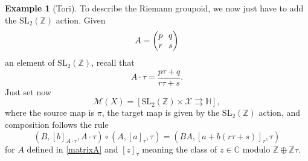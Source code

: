 \documentclass[JEP,XML,SOM,Unicode]{cedram}
\let\mathcal\mathscr
\newcommand{\SL}{\mathrm{SL}}
\theoremstyle{plain}
\theoremstyle{definition}
\newtheorem{example}[theorem]{Example}
\theoremstyle{remark}
\numberwithin{equation}{section}
\newcommand{\CC}{{\mathbb{C}}}
\begin{document}
\begin{example}[Tori]
To describe the Riemann groupoid, we now just have to add the $\SL_2(\mathbb Z)$ action. Given%
\begin{equation}
\label{matrixA}\arraycolsep3.5pt
A=\begin{pmatrix}
p &q\cr
r &s
\end{pmatrix}
\end{equation}
an element of $\SL_2(\mathbb Z)$, recall that
\begin{equation}
\label{sl2action}
A\cdot \tau=\dfrac{p\tau+q}{r\tau+s}.
\end{equation}
Just set now
\begin{equation}
\label{toriMgroupoid}
\mathcal M(X)=\left[\SL_2(\mathbb Z)\times\mathcal X\rightrightarrows \mathbb H\right ],
\end{equation}
where the source map is $\pi$, the target map is given by the $\SL_2(\mathbb Z)$ action, and composition follows the rule
\begin{equation}
\label{comptori}
(B,[b]_{A\cdot \tau},A\cdot \tau)\circ (A,[a]_\tau,\tau) =(BA,[a+b(r\tau+s)]_\tau, \tau)
\end{equation}
for $A$ defined in \eqref{matrixA} and $[z]_\tau$ meaning the class of $z\in\CC$ modulo $\mathbb Z\oplus\mathbb Z\tau$.


\end{example}
\end{document}
